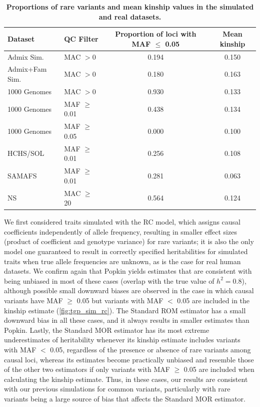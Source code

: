 \documentclass[11pt]{article}
\begin{document}
\begin{table}[h!]
    \centering
    \small
    \caption{\textbf{Proportions of rare variants and mean kinship values in the simulated and real datasets.}}
    \label{tab:maf}
    \begin{tabular}{llcc}
        \toprule
        Dataset & QC Filter & Proportion of loci with MAF $\leq$ 0.05 & Mean kinship \\
        \midrule
        Admix Sim.     & MAC $>0$        & 0.194 & 0.150 \\
        Admix+Fam Sim. & MAC $>0$        & 0.180 & 0.163 \\
        1000 Genomes   & MAC $>0$        & 0.930 & 0.133 \\
        1000 Genomes   & MAF $\geq$ 0.01 & 0.438 & 0.134 \\
        1000 Genomes   & MAF $\geq$ 0.05 & 0.000 & 0.100 \\
        HCHS/SOL       & MAF $\geq$ 0.01 & 0.256 & 0.108 \\
        SAMAFS         & MAF $\geq$ 0.01 & 0.281 & 0.063 \\
        NS             & MAC $\geq$ 20   & 0.564 & 0.124 \\
        \bottomrule
    \end{tabular}
\end{table}

We first considered traits simulated with the RC model, which assigns causal coefficients independently of allele frequency, resulting in smaller effect sizes (product of coefficient and genotype variance) for rare variants; it is also the only model one guaranteed to result in correctly specified heritabilities for simulated traits when true allele frequencies are unknown, as is the case for real human datasets.  We confirm again that Popkin yields estimates that are consistent with being unbiased in most of these cases (overlap with the true value of $h^2=0.8$), although possible small downward biases are observed in the case in which causal variants have MAF $\ge$ 0.05 but variants with MAF $<$ 0.05 are included in the kinship estimate (\cref{fig:tgp_sim_rc}).  The Standard ROM estimator has a small downward bias in all these cases, and it always results in smaller estimates than Popkin.  Lastly, the Standard MOR estimator has its most extreme underestimates of heritability whenever its kinship estimate includes variants with MAF $<$ 0.05, regardless of the presence or absence of rare variants among causal loci, whereas its estimates become practically unbiased and resemble those of the other two estimators if only variants with MAF $\ge$ 0.05 are included when calculating the kinship estimate.  Thus, in these cases, our results are consistent with our previous simulations for common variants, particularly with rare variants being a large source of bias that affects the Standard MOR estimator.
\end{document}
